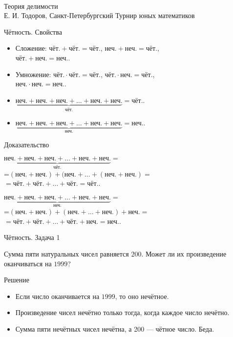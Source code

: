 \documentclass[17pt]{extarticle}
\newcommand{\newslide}[1]{\newpage \begin{center} \large #1 \end{center}}
\newcommand{\che}{\text{чёт.}}
\newcommand{\nech}{\text{неч.}}
\begin{document}
\ \\ [1cm]

\begin{center} {\Large Теория делимости} \bigskip \\
	{\large Е. И. Тодоров, Санкт-Петербургский Турнир юных математиков} \end{center}

\newslide{Чётность. Свойства}

\begin{itemize}\itemsep = 0mm
	\item Сложение: $\che + \che = \che$, $\nech+\nech = \che$,\\ $\che + \nech = \nech$.
	\item Умножение: $\che\cdot\che = \che$, $\che\cdot\nech = \che$,\\ $\nech\cdot\nech = \nech$.
	\item $\underbrace{\nech+\nech+\nech+\ldots+\nech+\nech}_{\che} = \che$.
	\item $\underbrace{\nech+\nech+\nech+\ldots+\nech+\nech}_{\nech} = \nech$.
\end{itemize}

\newslide{Доказательство} %

$\underbrace{\nech+\nech+\nech+\ldots+\nech+\nech}_{\che} =$\\
=$(\nech+\nech)+(\nech+\ldots+(\nech+\nech)=$\\
$= \che+\che+\ldots+\che = \che$.

$\underbrace{\nech+\nech+\nech+\ldots+\nech+\nech}_{\nech} =$\\
=$(\nech+\nech)+(\nech+\ldots+\nech)+\nech=$\\
$= \che+\che+\ldots+\che+\nech = \nech$.

\newslide{Чётность. Задача 1}

Сумма пяти натуральных чисел равняется $200$. Может ли их произведение оканчиваться на $1999$?

\newslide{Решение}

\begin{itemize}
\item Если число оканчивается на $1999$, то оно нечётное.
\item Произведение чисел нечётно только тогда, когда каждое число нечётно.
\item Сумма пяти нечётных чисел нечётна, а 200 --- чётное число. Беда.
\end{itemize}
\end{document}
